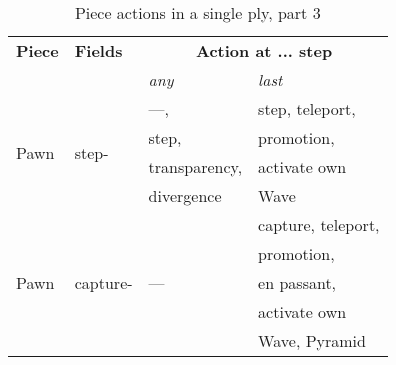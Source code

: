 \begin{table}[!h]
\centering
\begin{tabular}{ llll }
\toprule %
\textbf{Piece}              & \textbf{Fields}           & \multicolumn{2}{c}{ \textbf{Action at ... step} }         \\
                                                        \cmidrule{3-4} %
                            &                           & \emph{any}\footnotemark[1]    & \emph{last}               \\
\midrule %
\multirow{4}{*}{Pawn}       & \multirow{4}{*}{step-}    & ---\footnotemark[3],          & step, teleport,           \\
                            &                           & step\footnotemark[4],         & promotion,                \\
                            &                           & transparency\footnotemark[4], & activate own              \\
                            &                           & divergence\footnotemark[5]    & Wave                      \\
\cmidrule{1-4} %
\multirow{5}{*}{Pawn}       & \multirow{5}{*}{capture-} & \multirow{5}{*}{---}          & capture, teleport,        \\
                            &                           &                               & promotion\footnotemark[6],\\
                            &                           &                               & en passant,               \\
                            &                           &                               & activate own              \\
                            &                           &                               & Wave, Pyramid             \\
\bottomrule %
\end{tabular}
\caption{Piece actions in a single ply, part 3}
\label{tbl:Appendix/Summary/Piece actions, part 3}
\end{table}

